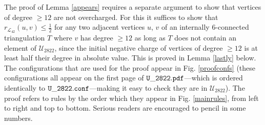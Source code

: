 \documentclass[11pt]{article}
\newcommand{\mcal}{\mathcal}
\newcommand{\m}{\mathcal}
\newcommand{\ncmath}{2822}
\begin{document}
The proof of Lemma \ref{appears} requires a separate argument to show that vertices of degree $\geq 12$ are not overcharged. For this it suffices to show that $r_{\m{L}_{42}}(u,v) \leq \frac{1}{2}$ for any two adjacent vertices $u$, $v$ of an internally 6-connected triangulation $T$ where $v$ has degree $\geq 12$ as long as $T$ does not contain an element of $\m{U}_{\ncmath}$, since the initial negative charge of vertices of degree $\geq 12$ is at least half their degree in absolute value. This is proved in Lemma \ref{lastly} below. The configurations that are used for the proof appear in Fig$.$ \ref{proofconfs} (these configurations all appear on the first page of  ${\tt U\_\ncmath.pdf}$---which is ordered identically to  ${\tt U\_\ncmath.conf}$---making it easy to check they are in $\mcal{U}_{\ncmath}$).
The proof refers to rules by the order which they appear in Fig$.$ \ref{mainrules}, from left to right and top to bottom. Serious readers are encouraged to pencil in some numbers.

\newcommand{\FtFfSoFfFtFfSoFf}{3}
\newcommand{\FtFfSoFsFtSfSoFf}{4}
\newcommand{\FtFfSoSsFtSsSoFf}{5}
\newcommand{\FtFsSoFsFtSfSoSf}{6}
\newcommand{\FtFsSoSfFtFsSoSf}{7}
\newcommand{\FtFsSoSsFtSsSoSf}{8}

\proofconfsfig
\end{document}

